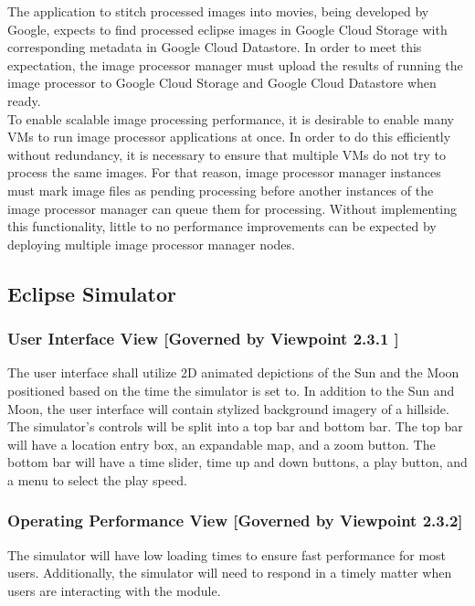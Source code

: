 \documentclass[10pt, onecolumn, draftclsnofoot, letterpaper, compsoc]{IEEEtran}
\begin{document}
    The application to stitch processed images into movies, being developed by Google, expects to find
    processed eclipse images in Google Cloud Storage with corresponding metadata in Google Cloud Datastore. In
    order to meet this expectation, the image processor manager must upload the results of running the image
    processor to Google Cloud Storage and Google Cloud Datastore when ready. \\

    To enable scalable image processing performance, it is desirable to enable many VMs to run image processor
    applications at once. In order to do this efficiently without redundancy, it is necessary to ensure that
    multiple VMs do not try to process the same images. For that reason, image processor manager instances must
    mark image files as pending processing before another instances of the image processor manager can queue
    them for processing. Without implementing this functionality, little to no performance improvements can be
    expected by deploying multiple image processor manager nodes. \\

\subsection{Eclipse Simulator}

  \subsubsection{User Interface View [Governed by Viewpoint 2.3.1 ]}
  The user interface shall utilize 2D animated depictions of
  the Sun and the Moon positioned based on the time the simulator is set to. In addition
  to the Sun and Moon, the user interface will contain stylized background imagery of a hillside. The
  simulator's controls will be split into a top bar and bottom bar. The top bar
  will have a location entry box, an expandable map, and a zoom button. The
  bottom bar will have a time slider, time up and down buttons, a play button,
  and a menu to select the play speed.  \\

  \subsubsection{Operating Performance View [Governed by Viewpoint 2.3.2]}
  The simulator will have low loading times to ensure fast
  performance for most users. Additionally, the simulator
  will need to respond in a timely matter when users are
  interacting with the module. \\
\end{document}
